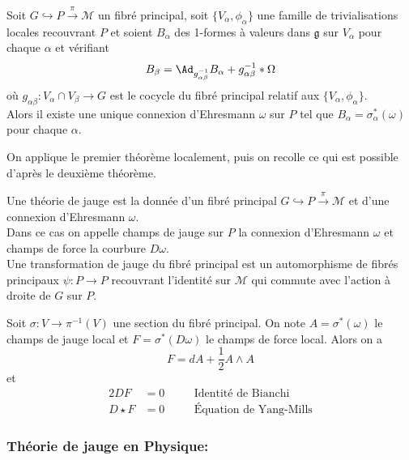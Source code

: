 \begin{thm}
Soit $G \hookrightarrow P \overset{\pi}{\to} \mathcal{M}$ un fibré principal, soit $\{V_\alpha, \phi_\alpha\}$ une famille de trivialisations locales recouvrant $P$ et soient $B_\alpha$ des 1-formes à valeurs dans $\mathfrak{g}$ sur $V_\alpha$ pour chaque $\alpha$ et vérifiant 
$$B_\beta = \Ad_{g_{\alpha\beta}^{-1}}B_\alpha + g_{\alpha\beta}^{-1}*\Omega$$ 
où $g_{\alpha\beta}: V_\alpha\cap V_\beta \to G$ est le cocycle du fibré principal relatif aux $\{V_\alpha, \phi_\alpha\}$. \\
Alors il existe une unique connexion d'Ehresmann $\omega$ sur $P$ tel que $B_\alpha = \sigma_\alpha^*(\omega)$ pour chaque $\alpha$.
\end{thm}
\begin{preu}
On applique le premier théorème localement, puis on recolle ce qui est possible d'après le deuxième théorème.
\end{preu}


\begin{defi}
Une théorie de jauge est la donnée d'un fibré principal $G \hookrightarrow P \overset{\pi}{\to} \mathcal{M}$ et d'une connexion d'Ehresmann $\omega$. \\
Dans ce cas on appelle champs de jauge sur $P$ la connexion d'Ehresmann $\omega$ et champs de force la courbure $D\omega$. \\
Une transformation de jauge du fibré principal est un automorphisme de fibrés principaux $\psi: P \to P$ recouvrant l'identité sur $\mathcal{M}$ qui commute avec l'action à droite de $G$ sur $P$.
\end{defi}

\begin{pro}
Soit $\sigma : V\to \pi^{-1}(V)$ une section du fibré principal. On note $A = \sigma^*(\omega)$ le champs de jauge local et $F = \sigma^*(D\omega)$ le champs de force local. Alors on a
$$F = dA + \frac{1}{2}A\wedge A$$
et
\begin{alignat*}{2}
DF & = 0   && \quad\text{Identité de Bianchi} \\
D\star F & = 0  && \quad\text{Équation de Yang-Mills}
\end{alignat*}
\end{pro}

\subsubsection{Théorie de jauge en Physique:}

